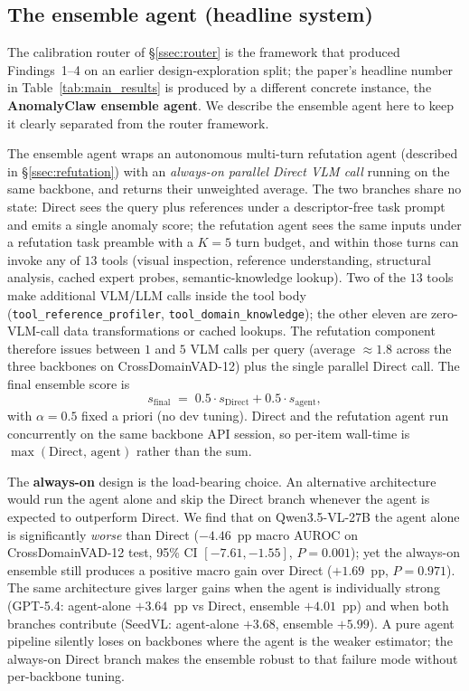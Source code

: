 \subsection{The ensemble agent (headline system)}
\label{ssec:v10}

The calibration router of \S\ref{ssec:router} is the framework that
produced Findings~1--4 on an earlier design-exploration split; the
paper's headline number in Table~\ref{tab:main_results} is produced by
a different concrete instance, the \textbf{AnomalyClaw ensemble agent}.
We describe the ensemble agent here to keep it clearly separated from
the router framework.

The ensemble agent wraps an autonomous multi-turn refutation agent
(described in \S\ref{ssec:refutation}) with an \emph{always-on parallel
Direct VLM call} running on the same backbone, and returns their
unweighted average. The two branches share no state: Direct sees the
query plus references under a descriptor-free task prompt and emits a
single anomaly score; the refutation agent sees the same inputs under a
refutation task preamble with a $K{=}5$ turn budget, and within those
turns can invoke any of $13$ tools (visual inspection, reference
understanding, structural analysis, cached expert probes,
semantic-knowledge lookup). Two of the $13$ tools make additional
VLM/LLM calls inside the tool body
(\texttt{tool\_reference\_profiler}, \texttt{tool\_domain\_knowledge});
the other eleven are zero-VLM-call data transformations or cached
lookups. The refutation component therefore issues between $1$ and $5$
VLM calls per query (average $\approx 1.8$ across the three backbones
on CrossDomainVAD-12) plus the single parallel Direct call. The final
ensemble score is
\[
  s_{\mathrm{final}} \;=\; 0.5 \cdot s_{\mathrm{Direct}} + 0.5 \cdot s_{\mathrm{agent}},
\]
with $\alpha{=}0.5$ fixed a priori (no dev tuning). Direct and the
refutation agent run concurrently on the same backbone API session, so
per-item wall-time is $\max(\text{Direct},\,\text{agent})$ rather than
the sum.

The \textbf{always-on} design is the load-bearing choice. An
alternative architecture would run the agent alone and skip the Direct
branch whenever the agent is expected to outperform Direct. We find
that on Qwen3.5-VL-27B the agent alone is significantly \emph{worse}
than Direct ($-4.46$~pp macro AUROC on CrossDomainVAD-12 test, 95\%
CI $[-7.61,-1.55]$, $P{=}0.001$); yet the always-on ensemble still
produces a positive macro gain over Direct ($+1.69$~pp, $P{=}0.971$).
The same architecture gives larger gains when the agent is individually
strong (GPT-5.4: agent-alone $+3.64$~pp vs Direct, ensemble
$+4.01$~pp) and when both branches contribute (SeedVL: agent-alone
$+3.68$, ensemble $+5.99$). A pure agent pipeline silently loses on
backbones where the agent is the weaker estimator; the always-on Direct
branch makes the ensemble robust to that failure mode without
per-backbone tuning.

